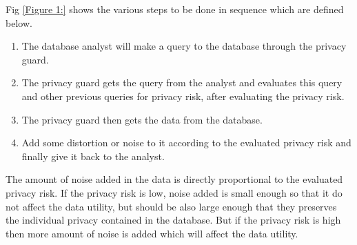 \documentclass[10pt,a4paper,journal]{IEEEtran}
\begin{document}
\hspace{2em}Fig \ref{Figure 1:} shows the various steps to be done in sequence which are defined below.
\begin{enumerate}

\item The database analyst will make a query to the database through the privacy guard. 
\item The privacy guard gets the query from the analyst and evaluates this query and other previous queries for privacy risk, after evaluating the privacy risk.
\item The privacy guard then gets the data from the database. 
\item Add some distortion or noise to it according to the evaluated privacy risk and finally give it back to the analyst.

\end{enumerate}

\hspace{2em}The amount of noise added in the data is directly proportional to the evaluated privacy risk. If the privacy risk is low, noise added is small enough so that it do not affect the data utility, but should be also large enough that they preserves the individual privacy contained in the database. But if the privacy risk is high then more amount of noise is added which will affect the data utility.
\end{document}

